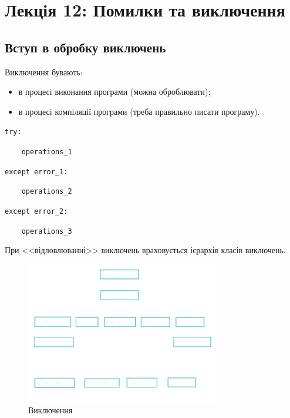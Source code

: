 \section{Лекція 12: Помилки та виключення}
 
 \subsection{Вступ в обробку виключень} 
\begin{frame}
Виключення бувають:
\begin{itemize}
  \item в процесі виконання програми (можна оброблювати);
  \item в процесі компіляції програми (треба правильно писати програму).
\end{itemize}

\texttt{try:}

\texttt{~~~~operations\_1}

\texttt{except error\_1:}

\texttt{~~~~operations\_2}

\texttt{except error\_2:}

\texttt{~~~~operations\_3}

При <<відловлюванні>> виключень враховується ієрархія класів виключень.
\end{frame}

\begin{frame}
\begin{figure}
\begin{center}
 \includegraphics[width=0.75\textwidth]{pictures/exception.png}
\caption{Виключення}
\label{exception} 
\end{center}
\end{figure}

\end{frame}

